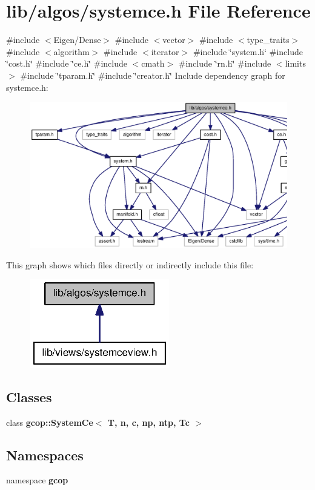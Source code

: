 \section{lib/algos/systemce.h \-File \-Reference}
\label{systemce_8h}
{\ttfamily \#include $<$\-Eigen/\-Dense$>$}\*
{\ttfamily \#include $<$vector$>$}\*
{\ttfamily \#include $<$type\-\_\-traits$>$}\*
{\ttfamily \#include $<$algorithm$>$}\*
{\ttfamily \#include $<$iterator$>$}\*
{\ttfamily \#include \char`\"{}system.\-h\char`\"{}}\*
{\ttfamily \#include \char`\"{}cost.\-h\char`\"{}}\*
{\ttfamily \#include \char`\"{}ce.\-h\char`\"{}}\*
{\ttfamily \#include $<$cmath$>$}\*
{\ttfamily \#include \char`\"{}rn.\-h\char`\"{}}\*
{\ttfamily \#include $<$limits$>$}\*
{\ttfamily \#include \char`\"{}tparam.\-h\char`\"{}}\*
{\ttfamily \#include \char`\"{}creator.\-h\char`\"{}}\*
\-Include dependency graph for systemce.\-h\-:
\nopagebreak
\begin{figure}[H]
\begin{center}
\leavevmode
\includegraphics[width=350pt]{systemce_8h__incl}
\end{center}
\end{figure}
\-This graph shows which files directly or indirectly include this file\-:
\nopagebreak
\begin{figure}[H]
\begin{center}
\leavevmode
\includegraphics[width=172pt]{systemce_8h__dep__incl}
\end{center}
\end{figure}
\subsection*{\-Classes}
\begin{DoxyCompactItemize}
\item 
class {\bf gcop\-::\-System\-Ce$<$ T, n, c, np, ntp, Tc $>$}
\end{DoxyCompactItemize}
\subsection*{\-Namespaces}
\begin{DoxyCompactItemize}
\item 
namespace {\bf gcop}
\end{DoxyCompactItemize}

